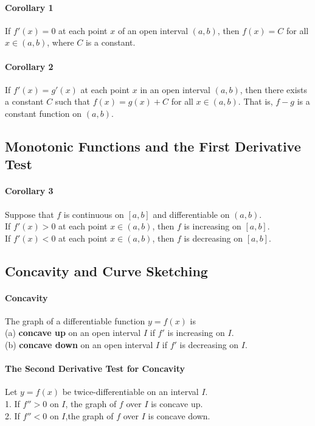 \documentclass{article}
\begin{document}
            \paragraph{Corollary 1} If $f'(x)=0$ at each point $x$ of an open interval $(a,b)$, then $f(x)=C$ for all $x\in (a,b)$, where $C$ is a constant.
            \paragraph{Corollary 2} If $f'(x)=g'(x)$ at each point $x$ in an open interval $(a,b)$, then there exists a constant $C$ such that $f(x)=g(x)+C$ for all $x\in (a,b)$. That is, $f-g$ is a constant function on $(a,b)$. 
        \subsection{Monotonic Functions and the First Derivative Test}
            \paragraph{Corollary 3} Suppose that $f$ is continuous on $[a,b]$ and differentiable on $(a,b)$.\\
                If $f'(x) > 0$ at each point $x\in (a,b)$, then $f$ is increasing on $[a,b]$.\\
                If $f'(x) < 0$ at each point $x\in (a,b)$, then $f$ is decreasing on $[a,b]$.\\
        \subsection{Concavity and Curve Sketching}
            \paragraph{Concavity} The graph of a differentiable function $y=f(x)$ is\\
            (a) \textbf{concave up} on an open interval $I$ if $f'$ is increasing on $I$.\\
            (b) \textbf{concave down} on an open interval $I$ if $f'$ is decreasing on $I$.

            \paragraph{The Second Derivative Test for Concavity} 
            Let $y=f(x)$ be twice-differentiable on an interval $I$.\\
            1. If $f''>0$ on $I$, the graph of $f$ over $I$ is concave up.\\
            2. If $f''<0$ on $I$,the graph of $f$ over $I$ is concave down.\\
            
\end{document}
